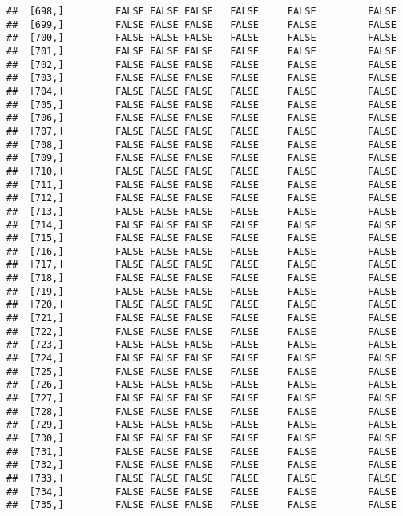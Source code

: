 \documentclass[
]{article}
\begin{document}
\begin{verbatim}
##  [698,]         FALSE FALSE FALSE   FALSE     FALSE         FALSE
##  [699,]         FALSE FALSE FALSE   FALSE     FALSE         FALSE
##  [700,]         FALSE FALSE FALSE   FALSE     FALSE         FALSE
##  [701,]         FALSE FALSE FALSE   FALSE     FALSE         FALSE
##  [702,]         FALSE FALSE FALSE   FALSE     FALSE         FALSE
##  [703,]         FALSE FALSE FALSE   FALSE     FALSE         FALSE
##  [704,]         FALSE FALSE FALSE   FALSE     FALSE         FALSE
##  [705,]         FALSE FALSE FALSE   FALSE     FALSE         FALSE
##  [706,]         FALSE FALSE FALSE   FALSE     FALSE         FALSE
##  [707,]         FALSE FALSE FALSE   FALSE     FALSE         FALSE
##  [708,]         FALSE FALSE FALSE   FALSE     FALSE         FALSE
##  [709,]         FALSE FALSE FALSE   FALSE     FALSE         FALSE
##  [710,]         FALSE FALSE FALSE   FALSE     FALSE         FALSE
##  [711,]         FALSE FALSE FALSE   FALSE     FALSE         FALSE
##  [712,]         FALSE FALSE FALSE   FALSE     FALSE         FALSE
##  [713,]         FALSE FALSE FALSE   FALSE     FALSE         FALSE
##  [714,]         FALSE FALSE FALSE   FALSE     FALSE         FALSE
##  [715,]         FALSE FALSE FALSE   FALSE     FALSE         FALSE
##  [716,]         FALSE FALSE FALSE   FALSE     FALSE         FALSE
##  [717,]         FALSE FALSE FALSE   FALSE     FALSE         FALSE
##  [718,]         FALSE FALSE FALSE   FALSE     FALSE         FALSE
##  [719,]         FALSE FALSE FALSE   FALSE     FALSE         FALSE
##  [720,]         FALSE FALSE FALSE   FALSE     FALSE         FALSE
##  [721,]         FALSE FALSE FALSE   FALSE     FALSE         FALSE
##  [722,]         FALSE FALSE FALSE   FALSE     FALSE         FALSE
##  [723,]         FALSE FALSE FALSE   FALSE     FALSE         FALSE
##  [724,]         FALSE FALSE FALSE   FALSE     FALSE         FALSE
##  [725,]         FALSE FALSE FALSE   FALSE     FALSE         FALSE
##  [726,]         FALSE FALSE FALSE   FALSE     FALSE         FALSE
##  [727,]         FALSE FALSE FALSE   FALSE     FALSE         FALSE
##  [728,]         FALSE FALSE FALSE   FALSE     FALSE         FALSE
##  [729,]         FALSE FALSE FALSE   FALSE     FALSE         FALSE
##  [730,]         FALSE FALSE FALSE   FALSE     FALSE         FALSE
##  [731,]         FALSE FALSE FALSE   FALSE     FALSE         FALSE
##  [732,]         FALSE FALSE FALSE   FALSE     FALSE         FALSE
##  [733,]         FALSE FALSE FALSE   FALSE     FALSE         FALSE
##  [734,]         FALSE FALSE FALSE   FALSE     FALSE         FALSE
##  [735,]         FALSE FALSE FALSE   FALSE     FALSE         FALSE

\end{verbatim}
\end{document}
